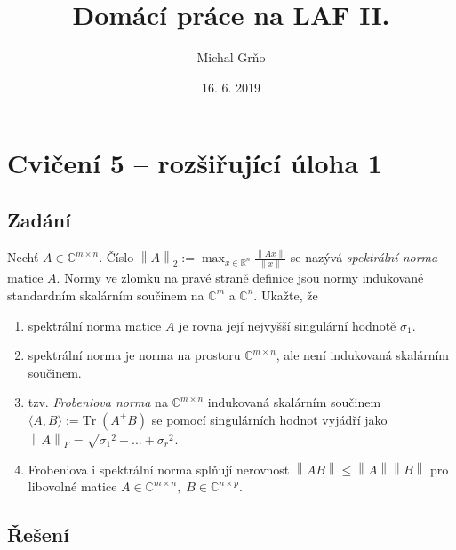 \documentclass[]{article}
\title{Domácí práce na LAF II.}
\date{16. 6. 2019}
\author{Michal Grňo}
\newcommand{\R}{\mathbb{R}}
\renewcommand{\C}{\mathbb{C}}
\newcommand{\Tr}{\mathrm{Tr}\;}
\newcommand{\norm}[1]{\left\lVert#1\right\rVert}
\newcommand{\x}{\times}
\begin{document}
\maketitle

\begingroup
\addtolength{\jot}{1em}

\section{Cvičení 5 – rozšiřující úloha 1}
\subsection{Zadání}
Nechť $A \in \C^{m \x n}$. Číslo $\norm{A}_2 := \max_{x \in \R^n} \frac{\norm{Ax}}{\norm{x}}$ se nazývá \textit{spektrální norma} matice $A$. Normy ve zlomku na pravé straně definice jsou normy indukované standardním skalárním součinem na $\C^m$ a $\C^n$. Ukažte, že
\begin{enumerate}
  \item spektrální norma matice $A$ je rovna její nejvyšší singulární hodnotě $\sigma_1$.
  \item spektrální norma je norma na prostoru $\C^{m \x n}$, ale není indukovaná skalárním součinem.
  \item tzv. \textit{Frobeniova norma} na $\C^{m \x n}$ indukovaná skalárním součinem $\langle A, B \rangle := \Tr(A^+B)$ se pomocí singulárních hodnot vyjádří jako $\norm{A}_F = \sqrt{ {\sigma_1}^2 + ... + {\sigma_r}^2}$.
  \item Frobeniova i spektrální norma splňují nerovnost $\norm{AB} \leq \norm{A}\norm{B}$ pro libovolné matice $A \in \C^{m \x n}, \; B \in \C^{n \x p}$.
\end{enumerate}

\subsection{Řešení}
\end{document}
